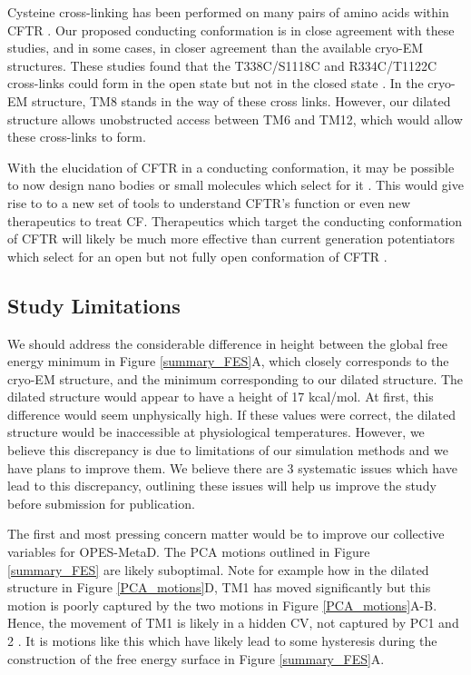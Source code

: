 Cysteine cross-linking has been performed on many pairs of amino acids within CFTR \cite{negoda2019, cui2008, negoda2018, wang2012}. Our proposed conducting conformation is in close agreement with these studies, and in some cases, in closer agreement than the available cryo-EM structures. These studies found that the T338C/S1118C and R334C/T1122C cross-links could form in the open state but not in the closed state \cite{wang2012}. In the cryo-EM structure, TM8 stands in the way of these cross links. However, our dilated structure allows unobstructed access between TM6 and TM12, which would allow these cross-links to form. 

With the elucidation of CFTR in a conducting conformation, it may be possible to now design nano bodies or small molecules which select for it \cite{hutter2019}. This would give rise to to a new set of tools to understand CFTR's function or even new therapeutics to treat CF. Therapeutics which target the conducting conformation of CFTR will likely be much more effective than current generation potentiators which select for an open but not fully open conformation of CFTR \cite{csanady2019, yeh2017}. 

\subsection{Study Limitations}

We should address the considerable difference in height between the global free energy minimum in Figure \ref{summary_FES}A, which closely corresponds to the cryo-EM structure, and the minimum corresponding to our dilated structure. The dilated structure would appear to have a height of 17 kcal/mol. At first, this difference would seem unphysically high. If these values were correct, the dilated structure would be inaccessible at physiological temperatures. However, we believe this discrepancy is due to limitations of our simulation methods and we have plans to improve them. We believe there are 3 systematic issues which have lead to this discrepancy, outlining these issues will help us improve the study before submission for publication. 

The first and most pressing concern matter would be to improve our collective variables for OPES-MetaD. The PCA motions outlined in Figure \ref{summary_FES} are likely suboptimal. Note for example how in the dilated structure in Figure \ref{PCA_motions}D, TM1 has moved significantly but this motion is poorly captured by the two motions in Figure \ref{PCA_motions}A-B. Hence, the movement of TM1 is likely in a hidden CV, not captured by PC1 and 2 \cite{bussi2015, bussi2020a}. It is motions like this which have likely lead to some hysteresis during the construction of the free energy surface in Figure \ref{summary_FES}A. 

